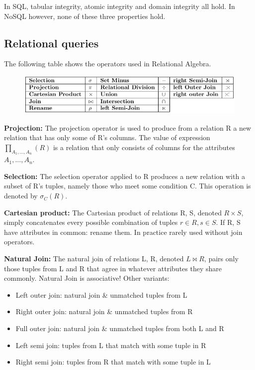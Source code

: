 \documentclass[11pt,oneside,a4paper]{article}
\begin{document}
In SQL, tabular integrity, atomic integrity and domain integrity all hold. In NoSQL however, none of these three properties hold.

\subsection{Relational queries}

The following table shows the operators used in Relational Algebra.

\vspace{-\topsep}
\begin{figure}[hb]
	\centering
	\includegraphics[width=0.7\linewidth]{figures/relational_algebra_operators}
	\label{fig:relationalalgebraoperators}
\end{figure}
\vspace{-\topsep}

\textbf{Projection:} The projection operator is used to produce from a relation R a new relation that has only some of R’s columns. The value of expression $\prod_{A_1,...,A_n}(R)$ is a relation that only
consists of columns for the attributes $A_1,...,A_n$.

\textbf{Selection:} The selection operator applied to R produces a new relation with a subset of R’s tuples, namely those who meet some condition C. This operation is denoted by $\sigma_C(R)$.

\textbf{Cartesian product:} The Cartesian product of relations R, S, denoted $R \times S$, simply concatenates every possible combination of tuples $r \in R, s \in S$. If R, S have attributes in common: rename them. In practice rarely used without join operators.

\textbf{Natural Join:} The natural join of relations L, R, denoted $L \bowtie R$, pairs only those tuples from L and R that agree in whatever attributes they share commonly. Natural Join is associative!
Other variants:

\vspace{-\topsep}
\begin{itemize}
	\setlength{\itemsep}{0pt}
	\setlength{\parskip}{0pt}
	\item Left outer join: natural join \& unmatched tuples from L
	\item Right outer join: natural join \& unmatched tuples from R
	\item Full outer join: natural join \& unmatched tuples from both L and R
	\item Left semi join: tuples from L that match with some tuple in R
	\item Right semi join: tuples from R that match with some tuple in L
\end{itemize}
\vspace{-\topsep}
\end{document}
